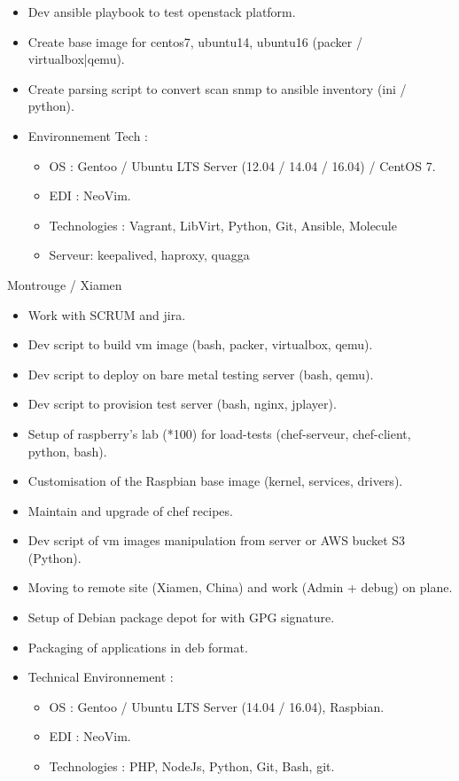 \documentclass[10pt,a4paper,sans]{moderncv}
\begin{document}
{\begin{itemize}
    \item Dev ansible playbook to test openstack platform.
    \item Create base image for centos7, ubuntu14, ubuntu16 (packer / virtualbox|qemu).
    \item Create parsing script to convert scan snmp to ansible inventory (ini / python).
    \item Environnement Tech :
      \begin{itemize}%
        \item OS : Gentoo / Ubuntu LTS Server (12.04 / 14.04 / 16.04) / CentOS 7.
        \item EDI : NeoVim.
        \item Technologies : Vagrant, LibVirt, Python, Git, Ansible, Molecule
        \item Serveur: keepalived, haproxy, quagga
      \end{itemize}
  \end{itemize}}

{Montrouge / Xiamen}{
  \begin{itemize}%
    \item Work with SCRUM and jira.
    \item Dev script to build vm image (bash, packer, virtualbox, qemu).
    \item Dev script to deploy on bare metal testing server (bash, qemu).
    \item Dev script to provision test server (bash, nginx, jplayer).
    \item Setup of raspberry's lab (*100) for load-tests (chef-serveur, chef-client, python, bash).
    \item Customisation of the Raspbian base image (kernel, services, drivers).
    \item Maintain and upgrade of chef recipes.
    \item Dev script of vm images manipulation from server or AWS bucket S3 (Python).
    \item Moving to remote site (Xiamen, China) and work (Admin + debug) on plane.
    \item Setup of Debian package depot for with GPG signature.
    \item Packaging of applications in deb format.
    \item Technical Environnement :
      \begin{itemize}%
        \item OS : Gentoo / Ubuntu LTS Server (14.04 / 16.04), Raspbian.
        \item EDI : NeoVim.
        \item Technologies : PHP, NodeJs, Python, Git, Bash, git.
      \end{itemize}
  \end{itemize}}
\end{document}
